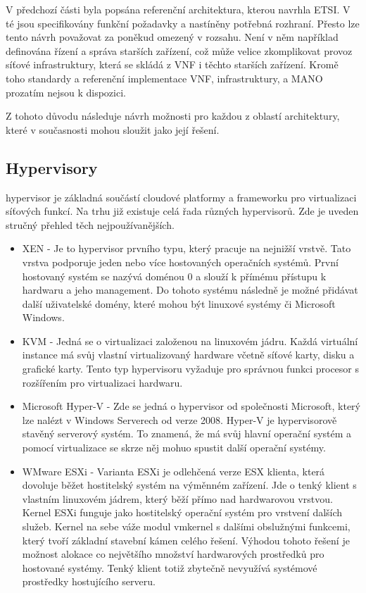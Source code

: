 V předchozí části byla popsána referenční architektura, kterou navrhla ETSI. V té jsou specifikovány funkční požadavky a nastíněny potřebná rozhraní. Přesto lze tento návrh považovat za poněkud omezený v rozsahu. Není v něm například definována řízení a správa starších zařízení, což může velice zkomplikovat provoz síťové infrastruktury, která se skládá z VNF i těchto starších zařízení. Kromě toho standardy a referenční implementace VNF, infrastruktury, a MANO prozatím nejsou k dispozici.

Z tohoto důvodu následuje návrh možnosti pro každou z oblastí architektury, které v současnosti mohou sloužit jako její řešení.


\subsection{Hypervisory} \label{sub:Hypervisor}

hypervisor je základná součástí cloudové platformy a frameworku pro virtualizaci síťových funkcí. Na trhu již existuje celá řada různých hypervisorů. Zde je uveden stručný přehled těch nejpoužívanějších.

\begin{itemize}
\item XEN - Je to hypervisor prvního typu, který pracuje na nejnižší vrstvě. Tato vrstva podporuje jeden nebo více hostovaných operačních systémů. První hostovaný systém se nazývá doménou 0 a slouží k přímému přístupu k hardwaru a jeho management. Do tohoto systému následně je možné přidávat další uživatelské domény, které mohou být linuxové systémy či Microsoft Windows.
\item KVM - Jedná se o virtualizaci založenou na linuxovém jádru. Každá virtuální instance má svůj vlastní virtualizovaný hardware včetně síťové karty, disku a grafické karty. Tento typ hypervisoru vyžaduje pro správnou funkci procesor s rozšířením pro virtualizaci hardwaru.
\item Microsoft Hyper-V - Zde se jedná o hypervisor od společnosti Microsoft, který lze nalézt v Windows Serverech od verze 2008. Hyper-V je hypervisorově stavěný serverový systém. To znamená, že má svůj hlavní operační systém a pomocí virtualizace se skrze něj mohuo spustit další operační systémy. 
\item WMware ESXi - Varianta  ESXi  je  odlehčená  verze ESX  klienta,  která  dovoluje  běžet  hostitelský systém na výměnném zařízení. Jde o tenký klient s vlastním linuxovém jádrem, který běží přímo nad hardwarovou vrstvou. Kernel ESXi funguje jako hostitelský operační systém pro vrstvení dalších služeb. Kernel na sebe váže modul vmkernel s dalšími obslužnými funkcemi, který tvoří základní stavební kámen celého řešení. Výhodou tohoto řešení  je možnost alokace co  největšího  množství  hardwarových prostředků  pro hostované systémy.  Tenký  klient  totiž  zbytečně nevyužívá  systémové prostředky  hostujícího  serveru.

\end{itemize}

